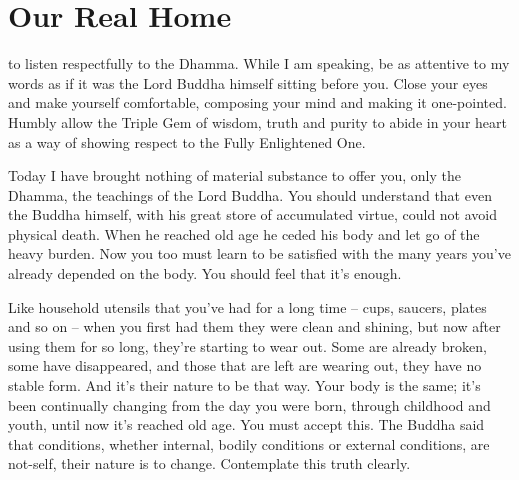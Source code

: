 
\chapter{Our Real Home}

\vspace*{0.5\baselineskip}
 to listen respectfully to the Dhamma. While I am speaking, be as attentive to my words as if it was the Lord Buddha himself sitting before you. Close your eyes and make yourself comfortable, composing your mind and making it one-pointed. Humbly allow the Triple Gem of wisdom, truth and purity to abide in your heart as a way of showing respect to the Fully Enlightened One. 

Today I have brought nothing of material substance to offer you, only the Dhamma, the teachings of the Lord Buddha. You should understand that even the Buddha himself, with his great store of accumulated virtue, could not avoid physical death. When he reached old age he ceded his body and let go of the heavy burden. Now you too must learn to be satisfied with the many years you've already depended on the body. You should feel that it's enough. 

Like household utensils that you've had for a long time -- cups, saucers, plates and so on -- when you first had them they were clean and shining, but now after using them for so long, they're starting to wear out. Some are already broken, some have disappeared, and those that are left are wearing out, they have no stable form. And it's their nature to be that way. Your body is the same; it's been continually changing from the day you were born, through childhood and youth, until now it's reached old age. You must accept this. The Buddha said that conditions, whether internal, bodily conditions or external conditions, are not-self, their nature is to change. Contemplate this truth clearly. 

